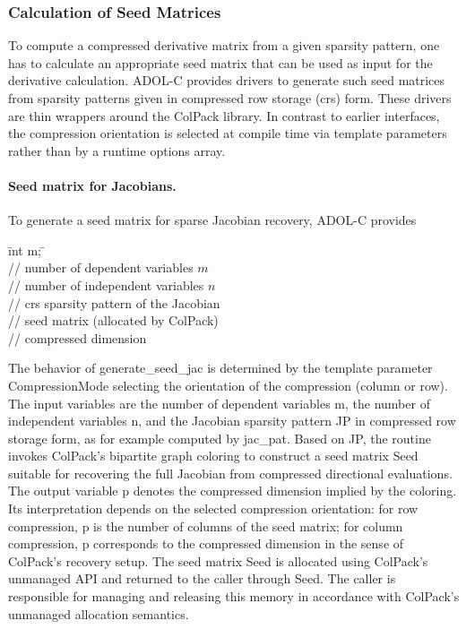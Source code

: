 \documentclass[11pt,twoside]{article}
\begin{document}
\subsubsection{Calculation of Seed Matrices}
%
To compute a compressed derivative matrix from a given sparsity
pattern, one has to calculate an appropriate seed matrix that can be
used as input for the derivative calculation. ADOL-C provides drivers
to generate such seed matrices from sparsity patterns given in
compressed row storage (crs) form. These drivers are thin wrappers
around the ColPack library.
%
In contrast to earlier interfaces, the compression orientation is
selected at compile time via template parameters rather than by a
runtime {\sf options} array.
%
\paragraph{Seed matrix for Jacobians.}
To generate a seed matrix for sparse Jacobian recovery, ADOL-C provides
\begin{tabbing}
\hspace{0.5in}\={\sf int m;} \hspace{1.3in}\= \kill
{}\\
                 \> // number of dependent variables $m$ \\
                 \> // number of independent variables $n$ \\
   \> // crs sparsity pattern of the Jacobian \\
        \> // seed matrix (allocated by ColPack) \\
                \> // compressed dimension \\
\end{tabbing}
%
The behavior of {\sf generate\_seed\_jac} is determined by the template
parameter {\sf CompressionMode} selecting the orientation of the
compression (column or row).
%
The input variables are the number of dependent variables {\sf m}, the
number of independent variables {\sf n}, and the Jacobian sparsity
pattern {\sf JP} in compressed row storage form, as for example computed
by {\sf jac\_pat}.  Based on {\sf JP}, the routine invokes ColPack's
bipartite graph coloring to construct a seed matrix {\sf Seed} suitable
for recovering the full Jacobian from compressed directional evaluations.
%
The output variable {\sf p} denotes the compressed dimension implied by
the coloring. Its interpretation depends on the selected compression
orientation: for row compression, {\sf p} is the number of columns of
the seed matrix; for column compression, {\sf p} corresponds to the
compressed dimension in the sense of ColPack's recovery setup.
%
The seed matrix {\sf Seed} is allocated using ColPack's unmanaged API
and returned to the caller through {\sf Seed}.  The caller is
responsible for managing and releasing this memory in accordance with
ColPack's unmanaged allocation semantics.
%
\end{document}
